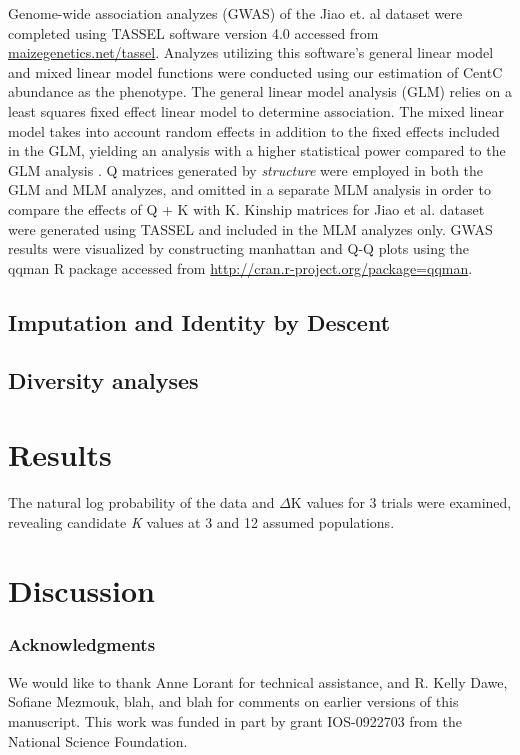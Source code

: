 \documentclass[12pt]{article}
\begin{document}
Genome-wide association analyzes (GWAS) of the Jiao et. al dataset were completed using TASSEL \cite{Bradbury2007} software version 4.0 accessed from \url{maizegenetics.net/tassel}.  Analyzes utilizing this software's general linear model and mixed linear model functions were conducted using our estimation of CentC abundance as the phenotype.  The general linear model analysis (GLM) relies on a least squares fixed effect linear model to determine association.  The mixed linear model takes into account random effects in addition to the fixed effects included in the GLM, yielding an analysis with a higher statistical power compared to the GLM analysis \cite{Yu2006}.  Q matrices generated by \emph{structure} were employed in both the GLM and MLM analyzes, and omitted in a separate MLM analysis in order to compare the effects of Q + K with K.  Kinship matrices for Jiao et al. dataset were generated using TASSEL and included in the MLM analyzes only.    
GWAS results were visualized by constructing manhattan and Q-Q plots using the qqman \cite{Turner2014} R package accessed from \url{http://cran.r-project.org/package=qqman}.   

\subsection{Imputation and Identity by Descent} %


\subsection{Diversity analyses} %


\section{Results}

The natural log probability of the data and  $\Delta$K values for 3 trials were examined, revealing candidate \emph{K} values at 3 and 12 assumed populations.    

\section{Discussion}

\subsubsection*{Acknowledgments}
We would like to thank Anne Lorant for technical assistance, and R. Kelly Dawe, Sofiane Mezmouk, blah, and blah for comments on earlier versions of this manuscript.  This work was funded in part by grant IOS-0922703 from the National Science Foundation.

\clearpage

\end{document}
